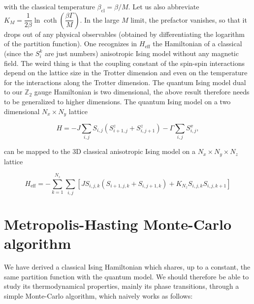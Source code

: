 \documentclass[11pt,openany]{article}
\begin{document}
with the classical temperature $\beta_\mathrm{cl} = \beta/M$. Let us also abbreviate $K_M = \dfrac{1}{2\beta}\ln\coth\left(\dfrac{\beta\Gamma}{M}\right)$. In the large $M$ limit, the prefactor vanishes, so that it drops out of any physical observables (obtained by differentiating the logarithm of the partition function). One recognizes in $H_\mathrm{eff}$ the Hamiltonian of a classical (since the $S_i^k$ are just numbers) anisotropic Ising model without any magnetic field. The weird thing is that the coupling constant of the spin-spin interactions depend on the lattice size in the Trotter dimension and even on the temperature for the interactions along the Trotter dimension. The quantum Ising model dual to our $\mathds{Z}_2$ gauge Hamiltonian is two dimensional, the above result therefore needs to be generalized to higher dimensions. The quantum Ising model on a two dimensional $N_x\times N_y$ lattice

\begin{equation}
	H = -J\sum_{i,j}S_{i,j}\left(S^z_{i+1,j} + S^z_{i,j+1}\right) -\Gamma\sum_{i,j}S^x_{i,j},
\end{equation}

can be mapped to the 3D classical anisotropic Ising model on a $N_x\times N_y \times N_z$ lattice

\begin{equation}
	H_\mathrm{eff} = -\sum_{k=1}^{N_z}\sum_{i,j}\left[J S_{i,j,k}\left(S_{i+1,j,k} + S_{i,j+1,k}\right) + K_{N_z} S_{i,j,k}S_{i,j,k+1}\right]
\end{equation}


\section{Metropolis-Hasting Monte-Carlo algorithm}

We have derived a classical Ising Hamiltonian which shares, up to a constant, the same partition function with the quantum model. We should therefore be able to study its thermodynamical properties, mainly its phase transitions, through a simple Monte-Carlo algorithm, which naively works as follows:
\end{document}
